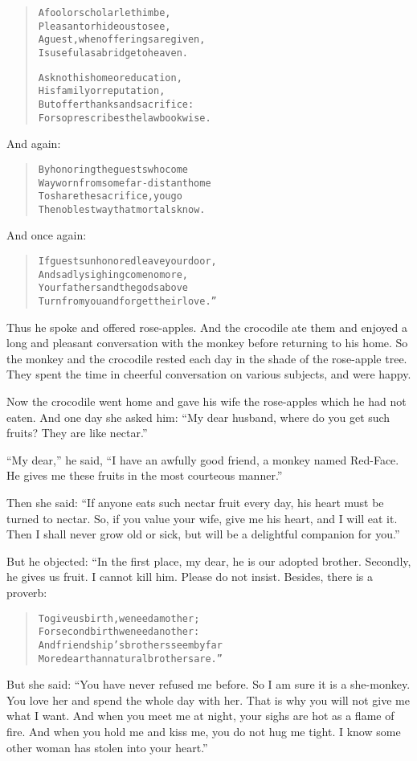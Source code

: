 \documentclass[article, twoside, 14pt]{memoir}
\renewenvironment{verbatim}{%
\begin{quote}%
\vskip -10pt%
\begin{alltt}\normalfont\large}{\end{alltt}%
\end{quote}%
\vskip -10pt
} %
\begin{document}
\begin{verbatim}
A fool or scholar let him be,
Pleasant or hideous to see,
A guest, when offerings are given,
Is useful as a bridge to heaven.

Ask not his home or education,
His family or reputation,
But offer thanks and sacrifice:
For so prescribes the lawbook wise.
\end{verbatim}
And again:

\begin{verbatim}
By honoring the guests who come
Wayworn from some far-distant home
To share the sacrifice, you go
The noblest way that mortals know.
\end{verbatim}
And once again:

\begin{verbatim}
If guests unhonored leave your door,
And sadly sighing come no more,
Your fathers and the gods above
Turn from you and forget their love.”
\end{verbatim}
Thus he spoke and offered rose-apples. And the crocodile ate them
and enjoyed a long and pleasant conversation with the monkey before
returning to his home. So the monkey and the crocodile rested each
day in the shade of the rose-apple tree. They spent the time in
cheerful conversation on various subjects, and were happy.

Now the crocodile went home and gave his wife the rose-apples which
he had not eaten. And one day she asked him:
``My dear husband, where do you get such fruits? They are like nectar.''

``My dear,'' he said,
``I have an awfully good friend, a monkey named Red-Face. He gives me these fruits in the most courteous manner.''

Then she said:
``If anyone eats such nectar fruit every day, his heart must be turned to nectar. So, if you value your wife, give me his heart, and I will eat it. Then I shall never grow old or sick, but will be a delightful companion for you.''

But he objected: “In the first place, my dear, he is our adopted
brother. Secondly, he gives us fruit. I cannot kill him. Please do
not insist. Besides, there is a proverb:

\begin{verbatim}
To give us birth, we need a mother;
For second birth we need another:
And friendship's brothers seem by far
More dear than natural brothers are.”
\end{verbatim}
But she said:
``You have never refused me before. So I am sure it is a she-monkey. You love her and spend the whole day with her. That is why you will not give me what I want. And when you meet me at night, your sighs are hot as a flame of fire. And when you hold me and kiss me, you do not hug me tight. I know some other woman has stolen into your heart.''
\end{document}
